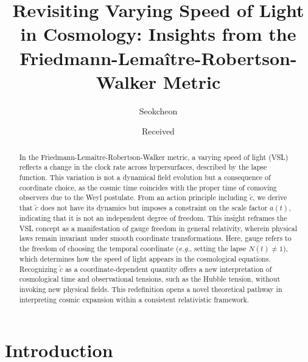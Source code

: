 \documentclass[jkps,preprint,fleqn]{revtex4} %
\newcommand{\tc}{\tilde{c}}
\begin{document}
 
\setcounter{page}{0}

\title[]{Revisiting Varying Speed of Light in Cosmology: Insights from the Friedmann-Lemaître-Robertson-Walker Metric}
\author{Seokcheon }

\date[]{Received }


\begin{abstract}
In the Friedmann-Lemaître-Robertson-Walker metric, a varying speed of light (VSL) reflects a change in the clock rate across hypersurfaces, described by the lapse function. This variation is not a dynamical field evolution but a consequence of coordinate choice, as the cosmic time coincides with the proper time of comoving observers due to the Weyl postulate. From an action principle including $\tc$, we derive that $\tc$ does not have its dynamics but imposes a constraint on the scale factor $a(t)$, indicating that it is not an independent degree of freedom. This insight reframes the VSL concept as a manifestation of gauge freedom in general relativity, wherein physical laws remain invariant under smooth coordinate transformations. Here, gauge refers to the freedom of choosing the temporal coordinate (\textit{e.g.}, setting the lapse $N(t) \neq 1$), which determines how the speed of light appears in the cosmological equations. Recognizing $\tc$ as a coordinate-dependent quantity offers a new interpretation of cosmological time and observational tensions, such as the Hubble tension, without invoking new physical fields. This redefinition opens a novel theoretical pathway in interpreting cosmic expansion within a consistent relativistic framework.
\end{abstract}



\maketitle

\tableofcontents



\section{Introduction}
\label{sec:intro}
\end{document}
